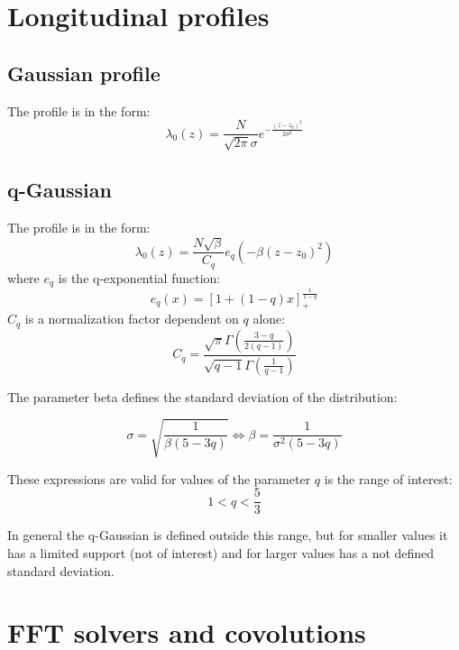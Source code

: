 \section{Longitudinal profiles}
\subsection{Gaussian profile}

The profile is in the form:
\begin{equation}
\lambda_{0}(z)=\frac{N}{\sqrt{2 \pi} \sigma} e^{-\frac{(z-z_0)^{2}}{2 \sigma^{2}}}
\end{equation}


\subsection{q-Gaussian}

The profile is in the form:
\begin{equation}
\lambda_0(z)=\frac{N\sqrt{\beta}}{C_{q}} e_{q}\left(-\beta (z-z_0)^{2}\right)
\end{equation}
where $e_q$ is the q-exponential function:
\begin{equation}
e_{q}(x)=[1+(1-q) x]_{+}^{\frac{1}{1-q}}
\end{equation}
$C_q$ is a normalization factor dependent on $q$ alone:
\begin{equation}
C_{q}=\frac{\sqrt{\pi} \Gamma\left(\frac{3-q}{2(q-1)}\right)}{\sqrt{q-1} \Gamma\left(\frac{1}{q-1}\right)}
\end{equation}

The parameter beta defines the standard deviation of the distribution:

\begin{equation}
\sigma = \sqrt{\frac{1}{\beta(5-3 q)}} \iff \beta ={\frac{1}{\sigma^2(5-3 q)}}
\end{equation}



These expressions are valid for values of the parameter $q$ is   the range of interest:
\begin{equation}
1<q<\frac{5}{3}
\end{equation}

In general the q-Gaussian is defined outside this range, but for smaller values it has a limited support (not of interest) and for larger values has a not defined standard deviation.



\section{FFT solvers and covolutions}



